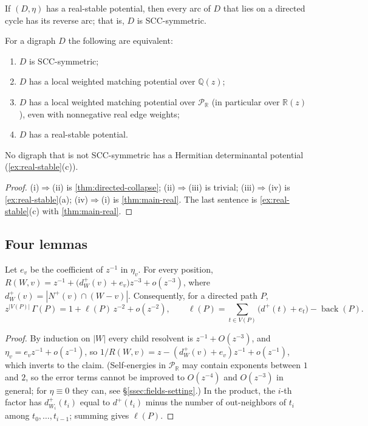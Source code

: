 \documentclass[final]{siamart0516}
\numberwithin{theorem}{section}
\numberwithin{equation}{section}
\theoremstyle{siamnonum}
\theoremstyle{plain}
\newcommand{\QQ}{\mathbb{Q}}
\newcommand{\RR}{\mathbb{R}}
\newcommand{\Qz}{\QQ(z)}
\newcommand{\Rz}{\RR(z)}
\newcommand{\Puis}{\mathcal{P}_{\RR}}
\newcommand{\back}{\operatorname{back}}
\newcommand{\nplus}{N^{+}}
\begin{document}
\begin{theorem}\label{thm:main-real}
If $(D,\eta)$ has a real-stable potential, then every arc of $D$ that lies on a directed cycle has its reverse arc; that is, $D$ is SCC-symmetric.
\end{theorem}

\begin{corollary}\label{cor:characterization}
For a digraph $D$ the following are equivalent:
\begin{enumerate}[label=\textup{(\roman*)}]
\item $D$ is SCC-symmetric;
\item $D$ has a local weighted matching potential over $\Qz$;
\item $D$ has a local weighted matching potential over $\Puis$ \textup{(}in particular over $\Rz$\textup{)}, even with nonnegative real edge weights;
\item $D$ has a real-stable potential.
\end{enumerate}
No digraph that is not SCC-symmetric has a Hermitian determinantal potential \textup{(}\cref{ex:real-stable}\textup{(c))}.
\end{corollary}
\begin{proof}
(i)$\Rightarrow$(ii) is \cref{thm:directed-collapse}; (ii)$\Rightarrow$(iii) is trivial; (iii)$\Rightarrow$(iv) is \cref{ex:real-stable}(a); (iv)$\Rightarrow$(i) is \cref{thm:main-real}. The last sentence is \cref{ex:real-stable}(c) with \cref{thm:main-real}.
\end{proof}

\subsection{Four lemmas}

\begin{lemma}\label{lem:asymptotics}
Let $e_v$ be the coefficient of $z^{-1}$ in $\eta_v$. For every position, $R(W,v)=z^{-1}+\bigl(d^{+}_W(v)+e_v\bigr)z^{-3}+o(z^{-3})$, where $d^{+}_W(v)=|\nplus(v)\cap(W-v)|$. Consequently, for a directed path $P$,
\[
z^{|V(P)|}\,\Gamma(P)=1+\ell(P)\,z^{-2}+o(z^{-2}),\qquad \ell(P)=\sum_{t\in V(P)}\bigl(d^{+}(t)+e_t\bigr)-\back(P).
\]
\end{lemma}
\begin{proof}
By induction on $|W|$ every child resolvent is $z^{-1}+O(z^{-3})$, and $\eta_v=e_vz^{-1}+o(z^{-1})$, so $1/R(W,v)=z-(d^{+}_W(v)+e_v)z^{-1}+o(z^{-1})$, which inverts to the claim. (Self-energies in $\Puis$ may contain exponents between $1$ and $2$, so the error terms cannot be improved to $O(z^{-4})$ and $O(z^{-3})$ in general; for $\eta\equiv0$ they can, see \S\ref{ssec:fields-setting}.) In the product, the $i$-th factor has $d^{+}_{W_i}(t_i)$ equal to $d^{+}(t_i)$ minus the number of out-neighbors of $t_i$ among $t_0,\dots,t_{i-1}$; summing gives $\ell(P)$.
\end{proof}
\end{document}
